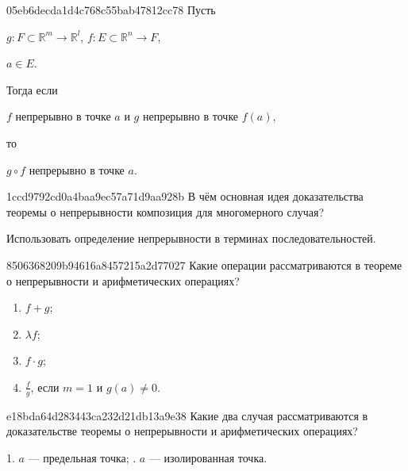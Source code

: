 \begin{note}{05eb6decda1d4c768c55bab47812cc78}
    Пусть \begin{icloze}{4}\({ g : F \subset \mathbb R^{m} \to \mathbb R^{l} }\),\: \({ f : E \subset \mathbb R^{n} \to F }\),\end{icloze}\: \begin{icloze}{3}\({ a \in E }\).\end{icloze}
    Тогда если \begin{icloze}{1}\({ f }\) непрерывно в точке \({ a }\) и \({ g }\) непрерывно в точке \({ f(a) }\),\end{icloze} то
    \begin{icloze}{2}
        \begin{center}
            \({ g \circ f }\) непрерывно в точке \({ a }\).
        \end{center}
    \end{icloze}
\end{note}

\begin{note}{1ccd9792cd0a4baa9ec57a71d9aa928b}
    В чём основная идея доказательства теоремы о непрерывности композиция для многомерного случая?

    \begin{cloze}{1}
        Использовать определение непрерывности в терминах последовательностей.
    \end{cloze}
\end{note}

\begin{note}{8506368209b94616a8457215a2d77027}
    Какие операции рассматриваются в теореме о непрерывности и арифметических операциях?

    \begin{cloze}{1}
        \begin{enumerate}
            \item \({ f + g }\);
            \item \({ \lambda f }\);
            \item \({ f \cdot g }\);
            \item \({ \frac{f}{g} }\), если \({ m = 1 }\) и \({ g (a) \neq 0 }\).
        \end{enumerate}
    \end{cloze}
\end{note}

\begin{note}{e18bda64d283443ca232d21db13a9e38}
    Какие два случая рассматриваются в доказательстве теоремы о непрерывности и арифметических операциях?

    \begin{cloze}{1}
        1. \({ a }\) --- предельная точка; . \({ a }\) --- изолированная точка.
    \end{cloze}
\end{note}

